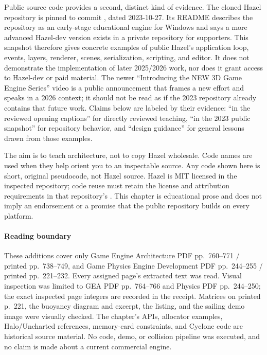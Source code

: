 Public source code provides a second, distinct kind of evidence. The cloned Hazel repository is pinned to commit , dated 2023-10-27. Its README describes the repository as an early-stage educational engine for Windows and says a more advanced Hazel-dev version exists in a private repository for supporters. This snapshot therefore gives concrete examples of public Hazel's application loop, events, layers, renderer, scenes, serialization, scripting, and editor. It does not demonstrate the implementation of later 2025/2026 work, nor does it grant access to Hazel-dev or paid material. The newer ``Introducing the NEW 3D Game Engine Series'' video is a public announcement that frames a new effort and speaks in a 2026 context; it should not be read as if the 2023 repository already contains that future work. Claims below are labeled by their evidence: ``in the reviewed opening captions'' for directly reviewed teaching, ``in the 2023 public snapshot'' for repository behavior, and ``design guidance'' for general lessons drawn from those examples.

The aim is to teach architecture, not to copy Hazel wholesale. Code names are used when they help orient you to an inspectable source. Any code shown here is short, original pseudocode, not Hazel source. Hazel is MIT licensed in the inspected repository; code reuse must retain the license and attribution requirements in that repository's . This chapter is educational prose and does not imply an endorsement or a promise that the public repository builds on every platform.

\paragraph{Reading boundary}\label{06-engine-ii-ch042-reading-boundary}

\hypertarget{06-engine-ii-ch042-reading-boundary}{}

These additions cover only Game Engine Architecture PDF pp.~760--771 / printed pp.~738--749, and Game Physics Engine Development PDF pp.~244--255 / printed pp.~221--232. Every assigned page's extracted text was read. Visual inspection was limited to GEA PDF pp.~764--766 and Physics PDF pp.~244--250; the exact inspected page integers are recorded in the receipt. Matrices on printed p.~221, the buoyancy diagram and excerpt, the  listing, and the sailing demo image were visually checked. The chapter's APIs, allocator examples, Halo/Uncharted references, memory-card constraints, and Cyclone code are historical source material. No code, demo, or collision pipeline was executed, and no claim is made about a current commercial engine.

